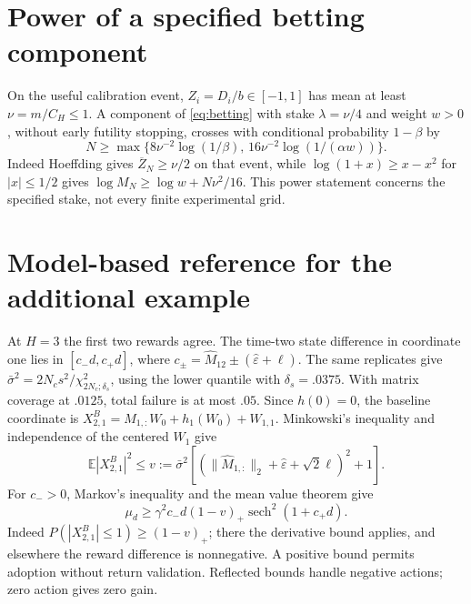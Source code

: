\documentclass[twocolumn,nameyear]{autart}
\begin{document}
\section{Power of a specified betting component}\label{app:sequential}
On the useful calibration event, $Z_i=D_i/b\in[-1,1]$ has mean at
least $\nu=m/C_H\le1$. A component of \eqref{eq:betting} with stake
$\lambda=\nu/4$ and weight $w>0$, without early futility stopping,
crosses with conditional probability $1-\beta$ by
\[
 N\ge\max\{8\nu^{-2}\log(1/\beta),\,
                 16\nu^{-2}\log(1/(\alpha w))\}.
\]
Indeed Hoeffding gives $\overline Z_N\ge\nu/2$ on that event, while
$\log(1+x)\ge x-x^2$ for $|x|\le1/2$ gives
$\log M_N\ge\log w+N\nu^2/16$. This power statement concerns the
specified stake, not every finite experimental grid.

\section{Model-based reference for the additional example}\label{app:model-reference}
At $H=3$ the first two rewards agree. The time-two state difference
in coordinate one lies in $[c_-d,c_+d]$, where
$c_\pm=\widehat M_{12}\pm(\widehat\varepsilon+\ell)$.
The same replicates give
$\bar\sigma^2=2N_cs^2/\chi^2_{2N_c;\delta_s}$,
using the lower quantile with $\delta_s=.0375$.
With matrix coverage at $.0125$, total failure is at most $.05$.
Since $h(0)=0$, the baseline coordinate is
$X^B_{2,1}=M_{1,:}W_0+h_1(W_0)+W_{1,1}$.
Minkowski's inequality and independence of the centered $W_1$ give
\[
 \mathbb E|X^B_{2,1}|^2\le v:=\bar\sigma^2
 [ (\|\widehat M_{1,:}\|_2+\widehat\varepsilon+\sqrt2\ell)^2+1].
\]
For $c_->0$, Markov's inequality and the mean value theorem give
\begin{equation}\label{eq:model-gain}
 \mu_d\ge\gamma^2c_-d(1-v)_+
              \operatorname{sech}^2(1+c_+d).
\end{equation}
Indeed $P(|X^B_{2,1}|\le1)\ge(1-v)_+$; there the derivative bound
applies, and elsewhere the reward difference is nonnegative.
A positive bound permits adoption without return validation.
Reflected bounds handle negative actions; zero action gives zero gain.



\end{document}
